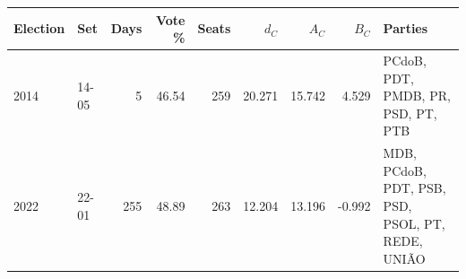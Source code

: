 \begin{tabularx}{\textwidth}{@{}llrrrrrr>{\raggedright\arraybackslash}X@{}}
\toprule
Election & Set & Days & Vote \% & Seats & \(d_C\) & \(A_C\) & \(B_C\) & Parties \\
\midrule
2014 & 14-05 & 5 & 46.54 & 259 & 20.271 & 15.742 & 4.529 & PCdoB, PDT, PMDB, PR, PSD, PT, PTB \\
2022 & 22-01 & 255 & 48.89 & 263 & 12.204 & 13.196 & -0.992 & MDB, PCdoB, PDT, PSB, PSD, PSOL, PT, REDE, UNIÃO \\
\bottomrule
\end{tabularx}
\par{}
